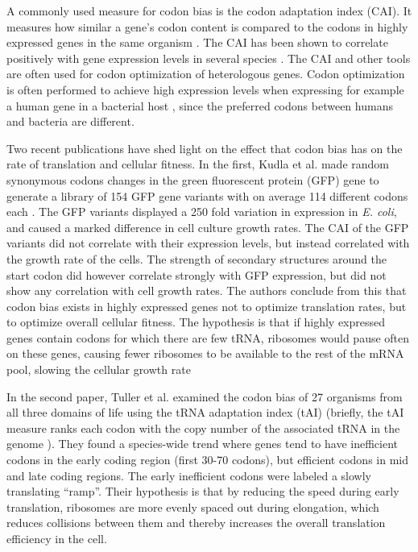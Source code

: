 A commonly used measure for codon bias is the codon adaptation index (CAI). It
measures how similar a gene's codon content is compared to the codons in highly
expressed genes in the same organism \cite{sharp_codon_1987}. The CAI has been
shown to correlate positively with gene expression levels in several species
\cite{duret_expression_1999, jansen_revisiting_2003}. The CAI and other tools
are often used for codon optimization of heterologous genes. Codon optimization
is often performed to achieve high expression levels when expressing for
example a human gene in a bacterial host \cite{gustafsson_codon_2004}, since
the preferred codons between humans and bacteria are different.

Two recent publications have shed light on the effect that codon bias has on
the rate of translation and cellular fitness. In the first, Kudla et al. made
random synonymous codons changes in the green fluorescent protein (GFP) gene to
generate a library of 154 GFP gene variants with on average 114 different
codons each \cite{kudla_coding-sequence_2009}. The GFP variants displayed a 250
fold variation in expression in \textit{E. coli}, and caused a marked
difference in cell culture growth rates. The CAI of the GFP variants did not
correlate with their expression levels, but instead correlated with the growth
rate of the cells. The strength of secondary structures around the start codon
did however correlate strongly with GFP expression, but did not show any
correlation with cell growth rates. The authors conclude from this that codon
bias exists in highly expressed genes not to optimize translation rates, but to
optimize overall cellular fitness. The hypothesis is that if highly expressed
genes contain codons for which there are few tRNA, ribosomes would pause often
on these genes, causing fewer ribosomes to be available to the rest of the mRNA
pool, slowing the cellular growth rate \cite{kudla_coding-sequence_2009}

In the second paper, Tuller et al. \cite{tuller_evolutionarily_2010} examined
the codon bias of 27 organisms from all three domains of life using the tRNA
adaptation index (tAI) (briefly, the tAI measure ranks each codon with the copy
number of the associated tRNA in the genome \cite{tuller_evolutionarily_2010}).
They found a species-wide trend where genes tend to have inefficient codons in
the early coding region (first 30-70 codons), but efficient codons in mid and
late coding regions. The early inefficient codons were labeled a slowly
translating ``ramp''. Their hypothesis is that by reducing the speed during
early translation, ribosomes are more evenly spaced out during elongation,
which reduces collisions between them and thereby increases the overall
translation efficiency in the cell.

